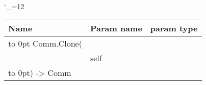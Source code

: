 \begingroup \catcode`\_=12 \tt
\begin{tabular}{lll}
\toprule
\textrm{Name}&\textrm{Param name}&\textrm{param type}\\
\midrule
\hbox to 0pt {Comm.Clone(\hss}\\
& self\\
\hbox to 0pt{) -> Comm\hss}\\
\bottomrule
\end{tabular}
\endgroup
